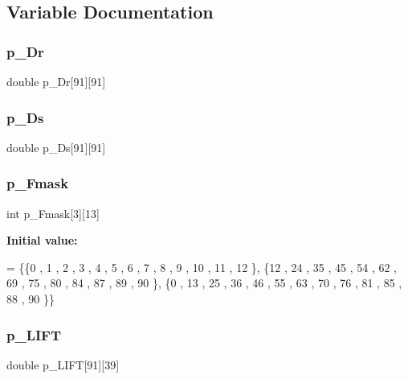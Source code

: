 \subsection{Variable Documentation}
\mbox{\label{a00539_abd93bbaf03b0b54f62c12114f2fa9f68}} 
\subsubsection{\texorpdfstring{p\+\_\+\+Dr}{p\_Dr}}
{\footnotesize\ttfamily double p\+\_\+\+Dr\mbox{[}91\mbox{]}\mbox{[}91\mbox{]}}

\mbox{\label{a00539_a4066fd722273c89275036a5f6aa547db}} 
\subsubsection{\texorpdfstring{p\+\_\+\+Ds}{p\_Ds}}
{\footnotesize\ttfamily double p\+\_\+\+Ds\mbox{[}91\mbox{]}\mbox{[}91\mbox{]}}

\mbox{\label{a00539_ac43e0997effa16e69805d0a9453fdf18}} 
\subsubsection{\texorpdfstring{p\+\_\+\+Fmask}{p\_Fmask}}
{\footnotesize\ttfamily int p\+\_\+\+Fmask\mbox{[}3\mbox{]}\mbox{[}13\mbox{]}}

{\bfseries Initial value\+:}
\begin{DoxyCode}
= \{\{0 , 1 , 2 , 3 , 4 , 5 , 6 , 7 , 8 , 9 , 10 , 11 , 12 \},
\{12 , 24 , 35 , 45 , 54 , 62 , 69 , 75 , 80 , 84 , 87 , 89 , 90 \},
\{0 , 13 , 25 , 36 , 46 , 55 , 63 , 70 , 76 , 81 , 85 , 88 , 90 \}\}
\end{DoxyCode}
\mbox{\label{a00539_a5d970ac3c85240fef91a6caed493eb4e}} 
\subsubsection{\texorpdfstring{p\+\_\+\+L\+I\+FT}{p\_LIFT}}
{\footnotesize\ttfamily double p\+\_\+\+L\+I\+FT\mbox{[}91\mbox{]}\mbox{[}39\mbox{]}}

